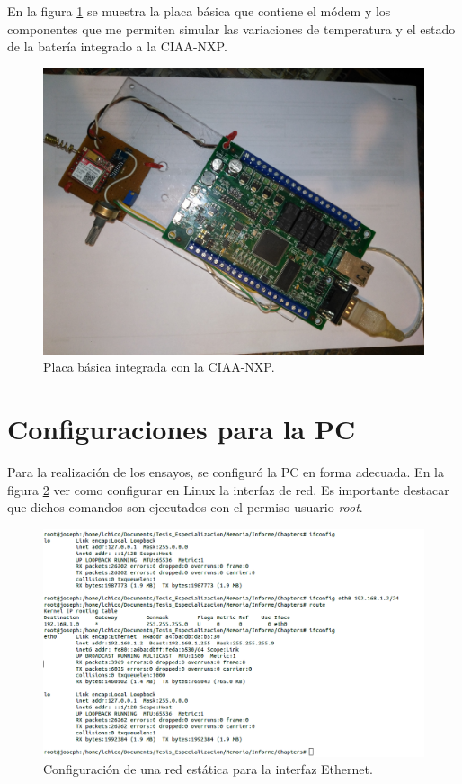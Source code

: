 En la figura \ref{fig:prototipo} se muestra la placa básica que contiene el módem y los componentes que me permiten simular las variaciones de temperatura y el estado de la batería integrado a la CIAA-NXP. 

\begin{figure}[h]
  \centering
  \includegraphics[scale=.1]{./Figures/prototipo.jpg}
  \caption{Placa básica integrada con la CIAA-NXP.}
  \label{fig:prototipo}
\end{figure}

\section{Configuraciones para la PC}

Para la realización de los ensayos, se configuró la PC en forma adecuada. En la figura \ref{fig:hw_pc} ver como configurar en Linux la interfaz de red. Es importante destacar que dichos comandos son ejecutados con el permiso usuario \emph{root}.

\begin{figure}[h]
  \centering
  \includegraphics[scale=.45]{./Figures/config_net_console.png}
  \caption{Configuración de una red estática para la interfaz Ethernet.}
  \label{fig:hw_pc}
\end{figure}

